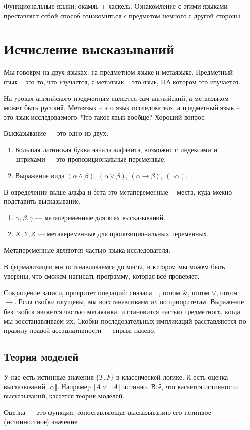 Функциональные языки: окамль + хаскель. 
Ознакомление с этими языками преставляет собой способ ознакомиться с предметом немного с другой стороны.

\section{Исчисление высказываний}
Мы говоирм на двух языках: на предметном языке и метаязыке.
Предметный язык -- это то, что изучается, а метаязык -- это язык, НА котором это изучается.

На уроках английского предметным является сам английский, а метаязыком может быть русский.
Метаязык -- это язык исследователя, а предметный язык -- это язык исследоваемого.
Что такое язык вообще? Хороший вопрос.

Высказывание --- это одно из двух: 
\begin{enumerate}
\item Большая латниская буква начала алфавита, возможно с индексами и штрихами --- это пропозициональные переменные.
\item Выражение вида $(\alpha \land \beta)$, $(\alpha \lor \beta)$, $(\alpha \to \beta)$, $(\neg \alpha)$. 
\end{enumerate}

В определении выше альфа и бета это метапеременные--- места, куда можно подставить высказывание.
\begin{enumerate}
\item $\alpha, \beta, \gamma$ --- метапеременные для всех высказываний.
\item $X, Y, Z$ --- метапеременные для пропозициональных переменных.
\end{enumerate}

Метапеременные являются частью языка исследователя.

В формализации мы останавливаемся до места, в котором мы можем быть уверены, что сможем написать программу, которая всё проверяет.

Сокращение записи, приоритет операций: сначала $\neg$, потом $\&$, потом $\vee$, потом $\to$.
Если скобки опущены, мы восстанавливаем их по приоритетам.
Выражение без скобок является частью метаязыка, и становится частью предметного, когда мы восстанавливаем их.
Скобки последовательных импликаций расставляются по правилу правой ассоциативности --- справа налево.
\subsection{Теория моделей}
У нас есть истинные значения $\{T, F\}$ в классической логике. 
И есть оценка высказываний $\llbracket \alpha\rrbracket$. 
Например $\llbracket A \lor \neg A\rrbracket$ истинно.
Всё, что касается истинности высказываний, касается теории моделей. 
\begin{definition}
    Оценка --- это функция, сопоставляющая высказыванию его истинное (истинностное) значение.
\end{definition}
